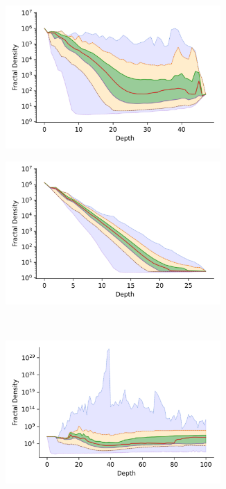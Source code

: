 \documentclass{article}
\begin{document}
\begin{figure}
\begin{subfigure}[b]{0.47\textwidth}
        \includegraphics[width=0.9\textwidth]{images/fractal_density/sift.png}\\
        \label{fig:supplement:sift-fractal_density}
    \end{subfigure}%
    \begin{subfigure}[b]{0.47\textwidth}
        \includegraphics[width=0.9\textwidth]{images/fractal_density/random.png}\\
        \label{fig:supplement:random-fractal_density}
    \end{subfigure}
    \\
    \begin{subfigure}[b]{0.47\textwidth}
        \includegraphics[width=0.9\textwidth]{images/fractal_density/silva-SSU-Ref.png}\\

\end{subfigure}
\end{figure}
\end{document}
